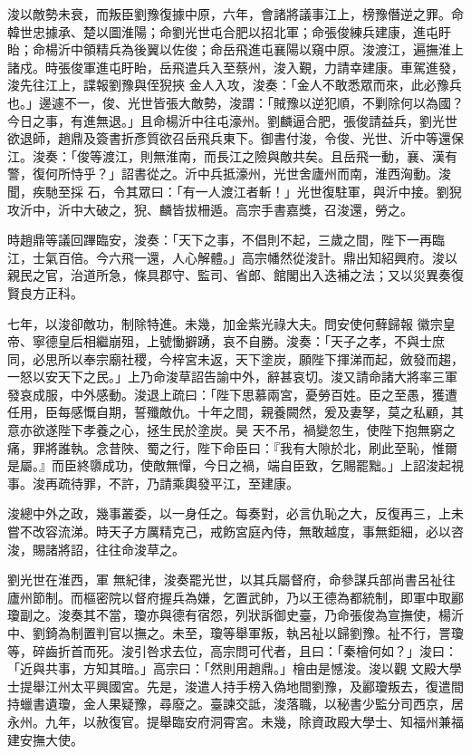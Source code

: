\begin{pinyinscope}
 浚以敵勢未衰，而叛臣劉豫復據中原，六年，會諸將議事江上，榜豫僭逆之罪。命韓世忠據承、楚以圖淮陽；命劉光世屯合肥以招北軍；命張俊練兵建康，進屯盱眙；命楊沂中領精兵為後翼以佐俊；命岳飛進屯襄陽以窺中原。浚渡江，遍撫淮上諸戍。時張俊軍進屯盱眙，岳飛遣兵入至蔡州，浚入覲，力請幸建康。車駕進發，浚先往江上，諜報劉豫與侄猊挾
 金人入攻，浚奏：「金人不敢悉眾而來，此必豫兵也。」邊遽不一，俊、光世皆張大敵勢，浚謂：「賊豫以逆犯順，不剿除何以為國？今日之事，有進無退。」且命楊沂中往屯濠州。劉麟逼合肥，張俊請益兵，劉光世欲退師，趙鼎及簽書折彥質欲召岳飛兵東下。御書付浚，令俊、光世、沂中等還保江。浚奏：「俊等渡江，則無淮南，而長江之險與敵共矣。且岳飛一動，襄、漢有警，復何所恃乎？」詔書從之。沂中兵抵濠州，光世舍廬州而南，淮西洶動。浚聞，疾馳至採
 石，令其眾曰：「有一人渡江者斬！」光世復駐軍，與沂中接。劉猊攻沂中，沂中大破之，猊、麟皆拔柵遁。高宗手書嘉獎，召浚還，勞之。



 時趙鼎等議回蹕臨安，浚奏：「天下之事，不倡則不起，三歲之間，陛下一再臨江，士氣百倍。今六飛一還，人心解體。」高宗幡然從浚計。鼎出知紹興府。浚以親民之官，治道所急，條具郡守、監司、省郎、館閣出入迭補之法；又以災異奏復賢良方正科。



 七年，以浚卻敵功，制除特進。未幾，加金紫光祿大夫。問安使何蘚歸報
 徽宗皇帝、寧德皇后相繼崩殂，上號慟擗踴，哀不自勝。浚奏：「天子之孝，不與士庶同，必思所以奉宗廟社稷，今梓宮未返，天下塗炭，願陛下揮涕而起，斂發而趨，一怒以安天下之民。」上乃命浚草詔告諭中外，辭甚哀切。浚又請命諸大將率三軍發哀成服，中外感動。浚退上疏曰：「陛下思慕兩宮，憂勞百姓。臣之至愚，獲遭任用，臣每感慨自期，誓殲敵仇。十年之間，親養闕然，爰及妻孥，莫之私顧，其意亦欲遂陛下孝養之心，拯生民於塗炭。昊
 天不吊，禍變忽生，使陛下抱無窮之痛，罪將誰執。念昔陜、蜀之行，陛下命臣曰：『我有大隙於北，刷此至恥，惟爾是屬。』而臣終隳成功，使敵無憚，今日之禍，端自臣致，乞賜罷黜。」上詔浚起視事。浚再疏待罪，不許，乃請乘輿發平江，至建康。



 浚總中外之政，幾事叢委，以一身任之。每奏對，必言仇恥之大，反復再三，上未嘗不改容流涕。時天子方厲精克己，戒飭宮庭內侍，無敢越度，事無鉅細，必以咨浚，賜諸將詔，往往命浚草之。



 劉光世在淮西，軍
 無紀律，浚奏罷光世，以其兵屬督府，命參謀兵部尚書呂祉往廬州節制。而樞密院以督府握兵為嫌，乞置武帥，乃以王德為都統制，即軍中取酈瓊副之。浚奏其不當，瓊亦與德有宿怨，列狀訴御史臺，乃命張俊為宣撫使，楊沂中、劉錡為制置判官以撫之。未至，瓊等舉軍叛，執呂祉以歸劉豫。祉不行，詈瓊等，碎齒折首而死。浚引咎求去位，高宗問可代者，且曰：「秦檜何如？」浚曰：「近與共事，方知其暗。」高宗曰：「然則用趙鼎。」檜由是憾浚。浚以觀
 文殿大學士提舉江州太平興國宮。先是，浚遣人持手榜入偽地間劉豫，及酈瓊叛去，復遣間持蠟書遺瓊，金人果疑豫，尋廢之。臺諫交詆，浚落職，以秘書少監分司西京，居永州。九年，以赦復官。提舉臨安府洞霄宮。未幾，除資政殿大學士、知福州兼福建安撫大使。




\end{pinyinscope}

